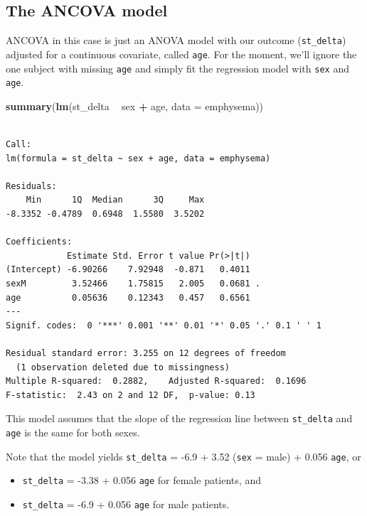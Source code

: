 \documentclass[]{book}
\newenvironment{Shaded}{\begin{snugshade}}{\end{snugshade}}
\newcommand{\KeywordTok}[1]{\textcolor[rgb]{0.13,0.29,0.53}{\textbf{#1}}}
\newcommand{\DataTypeTok}[1]{\textcolor[rgb]{0.13,0.29,0.53}{#1}}
\newcommand{\StringTok}[1]{\textcolor[rgb]{0.31,0.60,0.02}{#1}}
\newcommand{\OperatorTok}[1]{\textcolor[rgb]{0.81,0.36,0.00}{\textbf{#1}}}
\newcommand{\NormalTok}[1]{#1}
\providecommand{\tightlist}{%
  \setlength{\itemsep}{0pt}\setlength{\parskip}{0pt}}
\theoremstyle{definition}
\theoremstyle{definition}
\theoremstyle{definition}
\theoremstyle{remark}
\begin{document}
\subsection{The ANCOVA model}\label{the-ancova-model}

ANCOVA in this case is just an ANOVA model with our outcome
(\texttt{st\_delta}) adjusted for a continuous covariate, called
\texttt{age}. For the moment, we'll ignore the one subject with missing
\texttt{age} and simply fit the regression model with \texttt{sex} and
\texttt{age}.

\begin{Shaded}
\begin{Highlighting}[]
\KeywordTok{summary}\NormalTok{(}\KeywordTok{lm}\NormalTok{(st_delta }\OperatorTok{~}\StringTok{ }\NormalTok{sex }\OperatorTok{+}\StringTok{ }\NormalTok{age, }\DataTypeTok{data =}\NormalTok{ emphysema))}
\end{Highlighting}
\end{Shaded}

\begin{verbatim}

Call:
lm(formula = st_delta ~ sex + age, data = emphysema)

Residuals:
    Min      1Q  Median      3Q     Max 
-8.3352 -0.4789  0.6948  1.5580  3.5202 

Coefficients:
            Estimate Std. Error t value Pr(>|t|)  
(Intercept) -6.90266    7.92948  -0.871   0.4011  
sexM         3.52466    1.75815   2.005   0.0681 .
age          0.05636    0.12343   0.457   0.6561  
---
Signif. codes:  0 '***' 0.001 '**' 0.01 '*' 0.05 '.' 0.1 ' ' 1

Residual standard error: 3.255 on 12 degrees of freedom
  (1 observation deleted due to missingness)
Multiple R-squared:  0.2882,    Adjusted R-squared:  0.1696 
F-statistic:  2.43 on 2 and 12 DF,  p-value: 0.13
\end{verbatim}

This model assumes that the slope of the regression line between
\texttt{st\_delta} and \texttt{age} is the same for both sexes.

Note that the model yields \texttt{st\_delta} = -6.9 + 3.52
(\texttt{sex} = male) + 0.056 \texttt{age}, or

\begin{itemize}
\tightlist
\item
  \texttt{st\_delta} = -3.38 + 0.056 \texttt{age} for female patients,
  and
\item
  \texttt{st\_delta} = -6.9 + 0.056 \texttt{age} for male patients.
\end{itemize}
\end{document}
